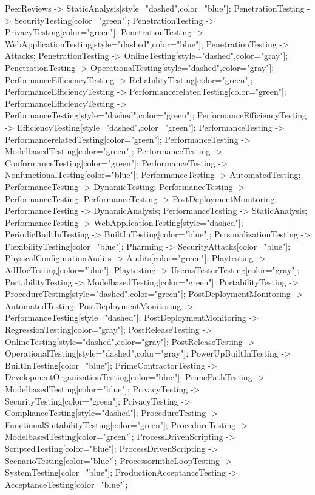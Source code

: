\documentclass{article}
\begin{document}
{PeerReviews -> StaticAnalysis[style="dashed",color="blue"];
PenetrationTesting -> SecurityTesting[color="green"];
PenetrationTesting -> PrivacyTesting[color="green"];
PenetrationTesting -> WebApplicationTesting[style="dashed",color="blue"];
PenetrationTesting -> Attacks;
PenetrationTesting -> OnlineTesting[style="dashed",color="gray"];
PenetrationTesting -> OperationalTesting[style="dashed",color="gray"];
PerformanceEfficiencyTesting -> ReliabilityTesting[color="green"];
PerformanceEfficiencyTesting -> PerformancerelatedTesting[color="green"];
PerformanceEfficiencyTesting -> PerformanceTesting[style="dashed",color="green"];
PerformanceEfficiencyTesting -> EfficiencyTesting[style="dashed",color="green"];
PerformanceTesting -> PerformancerelatedTesting[color="green"];
PerformanceTesting -> ModelbasedTesting[color="green"];
PerformanceTesting -> ConformanceTesting[color="green"];
PerformanceTesting -> NonfunctionalTesting[color="blue"];
PerformanceTesting -> AutomatedTesting;
PerformanceTesting -> DynamicTesting;
PerformanceTesting -> PerformanceTesting;
PerformanceTesting -> PostDeploymentMonitoring;
PerformanceTesting -> DynamicAnalysis;
PerformanceTesting -> StaticAnalysis;
PerformanceTesting -> WebApplicationTesting[style="dashed"];
PeriodicBuiltInTesting -> BuiltInTesting[color="blue"];
PersonalizationTesting -> FlexibilityTesting[color="blue"];
Pharming -> SecurityAttacks[color="blue"];
PhysicalConfigurationAudits -> Audits[color="green"];
Playtesting -> AdHocTesting[color="blue"];
Playtesting -> UserasTesterTesting[color="gray"];
PortabilityTesting -> ModelbasedTesting[color="green"];
PortabilityTesting -> ProcedureTesting[style="dashed",color="green"];
PostDeploymentMonitoring -> AutomatedTesting;
PostDeploymentMonitoring -> PerformanceTesting[style="dashed"];
PostDeploymentMonitoring -> RegressionTesting[color="gray"];
PostReleaseTesting -> OnlineTesting[style="dashed",color="gray"];
PostReleaseTesting -> OperationalTesting[style="dashed",color="gray"];
PowerUpBuiltInTesting -> BuiltInTesting[color="blue"];
PrimeContractorTesting -> DevelopmentOrganizationTesting[color="blue"];
PrimePathTesting -> ModelbasedTesting[color="blue"];
PrivacyTesting -> SecurityTesting[color="green"];
PrivacyTesting -> ComplianceTesting[style="dashed"];
ProcedureTesting -> FunctionalSuitabilityTesting[color="green"];
ProcedureTesting -> ModelbasedTesting[color="green"];
ProcessDrivenScripting -> ScriptedTesting[color="blue"];
ProcessDrivenScripting -> ScenarioTesting[color="blue"];
ProcessorintheLoopTesting -> SystemTesting[color="blue"];
ProductionAcceptanceTesting -> AcceptanceTesting[color="blue"];
}
\end{document}
